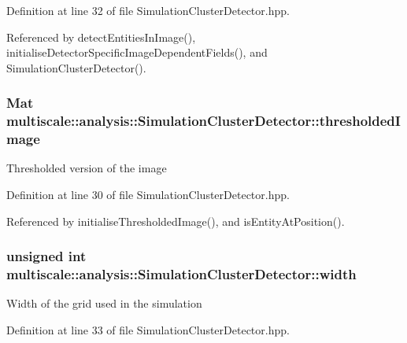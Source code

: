 Definition at line 32 of file Simulation\-Cluster\-Detector.\-hpp.



Referenced by detect\-Entities\-In\-Image(), initialise\-Detector\-Specific\-Image\-Dependent\-Fields(), and Simulation\-Cluster\-Detector().

\hypertarget{classmultiscale_1_1analysis_1_1SimulationClusterDetector_aca2aae9914ef643a543a834e61b1cccf}{
\subsubsection[{thresholded\-Image}]{\setlength{\rightskip}{0pt plus 5cm}Mat multiscale\-::analysis\-::\-Simulation\-Cluster\-Detector\-::thresholded\-Image\hspace{0.3cm}{\ttfamily [private]}}}\label{classmultiscale_1_1analysis_1_1SimulationClusterDetector_aca2aae9914ef643a543a834e61b1cccf}
Thresholded version of the image 

Definition at line 30 of file Simulation\-Cluster\-Detector.\-hpp.



Referenced by initialise\-Thresholded\-Image(), and is\-Entity\-At\-Position().

\hypertarget{classmultiscale_1_1analysis_1_1SimulationClusterDetector_a4c66a82aa1749dce31c767bc4008d904}{
\subsubsection[{width}]{\setlength{\rightskip}{0pt plus 5cm}unsigned int multiscale\-::analysis\-::\-Simulation\-Cluster\-Detector\-::width\hspace{0.3cm}{\ttfamily [private]}}}\label{classmultiscale_1_1analysis_1_1SimulationClusterDetector_a4c66a82aa1749dce31c767bc4008d904}
Width of the grid used in the simulation 

Definition at line 33 of file Simulation\-Cluster\-Detector.\-hpp.



